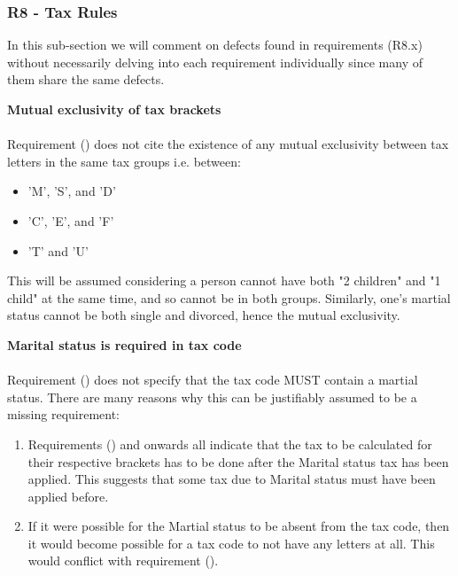 \subsubsection{R8 - Tax Rules}

In this sub-section we will comment on defects found in requirements (R8.x) without necessarily delving into each requirement individually since many of them share the same defects. 
\par
\textbf{Mutual exclusivity of tax brackets \\}
\\
Requirement (\REightFour) does not cite the existence of any mutual exclusivity between tax letters in the same tax groups i.e. between: 
\begin{itemize}[noitemsep]
	\item 'M', 'S', and 'D' 
	\item 'C', 'E', and 'F'
	\item 'T' and 'U'
\end{itemize}
This will be assumed considering a person cannot have both "2 children" and "1 child" at the same time, and so cannot be in both groups. Similarly, one's martial status cannot be both single and divorced, hence the mutual exclusivity.  

\textbf{Marital status is required in tax code \\}
\\
Requirement (\REightFour) does not specify that the tax code MUST contain a martial status. There are many reasons why this can be justifiably assumed to be a missing requirement: 
\begin{enumerate}
	\item Requirements (\REightEight) and onwards all indicate that the tax to be calculated for their respective brackets has to be done after the Marital status tax has been applied. This suggests that some tax due to Marital status must have been applied before. 
	\item If it were possible for the Martial status to be absent from the tax code, then it would become possible for a tax code to not have any letters at all. This would conflict with requirement (\REightTwo). %
\end{enumerate}

